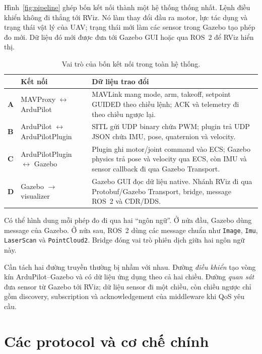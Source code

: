\documentclass[a4paper]{article}
\begin{document}
Hình~\ref{fig:pipeline} ghép bốn kết nối thành một hệ thống thống nhất. Lệnh điều khiển không đi thẳng tới RViz. Nó làm thay đổi đầu ra motor, lực tác dụng và trạng thái vật lý của UAV; trạng thái mới làm các sensor trong Gazebo tạo phép đo mới. Dữ liệu đó mới được đưa tới Gazebo GUI hoặc qua ROS~2 để RViz hiển thị.

\begin{table}[H]
\centering
\small
\renewcommand{\arraystretch}{1.18}
\begin{tabularx}{\textwidth}{@{}>{\bfseries}p{7mm}>{\RaggedRight\arraybackslash}p{43mm}>{\RaggedRight\arraybackslash}X@{}}
\toprule
 & Kết nối & Dữ liệu trao đổi \\
\midrule
A & MAVProxy $\leftrightarrow$ ArduPilot & MAVLink mang mode, arm, takeoff, setpoint GUIDED theo chiều lệnh; ACK và telemetry đi theo chiều ngược lại. \\
B & ArduPilot $\leftrightarrow$ ArduPilotPlugin & SITL gửi UDP binary chứa PWM; plugin trả UDP JSON chứa IMU, pose, quaternion và velocity. \\
C & ArduPilotPlugin $\leftrightarrow$ Gazebo & Plugin ghi motor/joint command vào ECS; Gazebo physics trả pose và velocity qua ECS, còn IMU và sensor callback đi qua Gazebo Transport. \\
D & Gazebo $\rightarrow$ visualizer & Gazebo GUI đọc dữ liệu native. Nhánh RViz đi qua Protobuf/Gazebo Transport, bridge, message ROS~2 và CDR/DDS. \\
\bottomrule
\end{tabularx}
\caption{Vai trò của bốn kết nối trong toàn hệ thống.}
\label{tab:overall-links}
\end{table}

Có thể hình dung mỗi phép đo đi qua hai ``ngôn ngữ''. Ở nửa đầu, Gazebo dùng message của Gazebo. Ở nửa sau, ROS~2 dùng các message chuẩn như \texttt{Image}, \texttt{Imu}, \texttt{LaserScan} và \texttt{PointCloud2}. Bridge đóng vai trò phiên dịch giữa hai ngôn ngữ này.

Cần tách hai đường truyền thường bị nhầm với nhau. Đường \emph{điều khiển} tạo vòng kín ArduPilot--Gazebo và có dữ liệu ứng dụng theo cả hai chiều. Đường \emph{quan sát} đưa sensor từ Gazebo tới RViz; dữ liệu sensor đi một chiều, còn chiều ngược chỉ gồm discovery, subscription và acknowledgement của middleware khi QoS yêu cầu.

\section{Các protocol và cơ chế chính}
\end{document}

